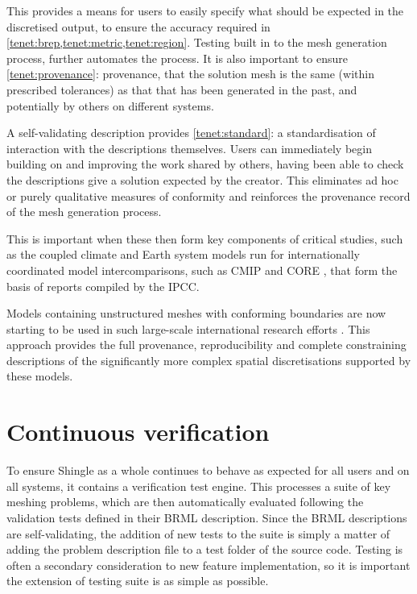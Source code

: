 \documentclass[a4paper, 10pt]{book}
\providecommand{\shingle}{Shingle\xspace}
\providecommand{\brml}{BRML\xspace}
\begin{document}
This provides a means for users to easily specify what should be expected in the discretised output,
to ensure the accuracy required in \cref{tenet:brep,tenet:metric,tenet:region}.
%
Testing built in to the mesh generation process, further automates the process.
%
It is also important to ensure \cref{tenet:provenance}: provenance, that the solution mesh is the same (within prescribed tolerances) as that that has been generated in the past, and potentially by others on different systems.

A self-validating description provides \cref{tenet:standard}: a standardisation of interaction with the descriptions themselves.
Users can immediately begin building on and improving the work shared by others, having been able to check the descriptions give a solution expected by the creator.
%
This eliminates ad hoc or purely qualitative measures of conformity and reinforces the provenance record of the mesh generation process.

This is important when these then form key components of critical studies, such as the
coupled climate and Earth system models run for
%
internationally
coordinated
model intercomparisons,
such as 
CMIP and CORE
\citep{meehl07,taylor12,coreii},
that form the basis of
reports compiled by the IPCC.


Models containing unstructured meshes with conforming boundaries are now starting to be used in such large-scale international research efforts
\citep[e.g. FESOM,][]{sidorenko14}.
This approach provides the 
full provenance, reproducibility and complete constraining descriptions of the significantly more complex spatial discretisations supported by these models.


\section{Continuous verification}
\label{sec:continuousverification}
%
To ensure \shingle as a whole continues to behave as expected for all users and on all systems, it contains a verification test engine.
%
This processes a suite of key meshing problems, which are then automatically evaluated following the validation tests defined in their \brml description.
%
Since the \brml descriptions are self-validating, the addition of new tests to the suite is simply a matter of adding the problem description file to a test folder of the source code.
%
Testing is often a secondary consideration to new feature implementation, so it is important the extension of testing suite is as simple as possible.
\end{document}
